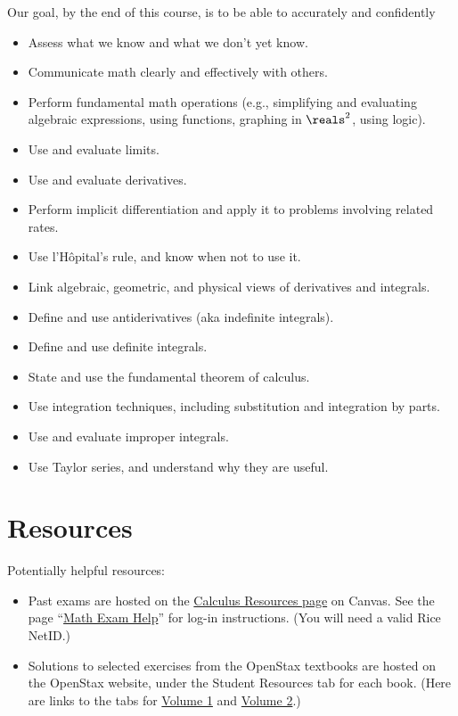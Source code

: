 Our goal, by the end of this course, is to be able to accurately and confidently
\begin{itemize}
\item Assess what we know and what we don't yet know.
\item Communicate math clearly and effectively with others.
\item Perform fundamental math operations (e.g., simplifying and evaluating algebraic expressions, using functions, graphing in $\reals^{2}$, using logic).
\item Use and evaluate limits.
\item Use and evaluate derivatives.
\item Perform implicit differentiation and apply it to problems involving related rates.
\item Use l'H\^{o}pital's rule, and know when not to use it.
\item Link algebraic, geometric, and physical views of derivatives and integrals.
\item Define and use antiderivatives (aka indefinite integrals).
\item Define and use definite integrals.
\item State and use the fundamental theorem of calculus.
\item Use integration techniques, including substitution and integration by parts.%
\item Use and evaluate improper integrals.
\item Use Taylor series, and understand why they are useful.
\end{itemize}





%
%
%
%

\section{Resources}

Potentially helpful resources:
\begin{itemize}
\item Past exams are hosted on the \href{https://canvas.rice.edu/courses/9592/files}{Calculus Resources page} on Canvas. See the page ``\href{https://math.rice.edu/exam-help}{Math Exam Help}'' for log-in instructions. (You will need a valid Rice NetID.)
\item Solutions to selected exercises from the OpenStax textbooks are hosted on the OpenStax website, under the Student Resources tab for each book. (Here are links to the tabs for \href{https://openstax.org/details/books/calculus-volume-1?Student\%20resources}{Volume 1} and \href{https://openstax.org/details/books/calculus-volume-2?Student\%20resources}{Volume 2}.)
\end{itemize}





